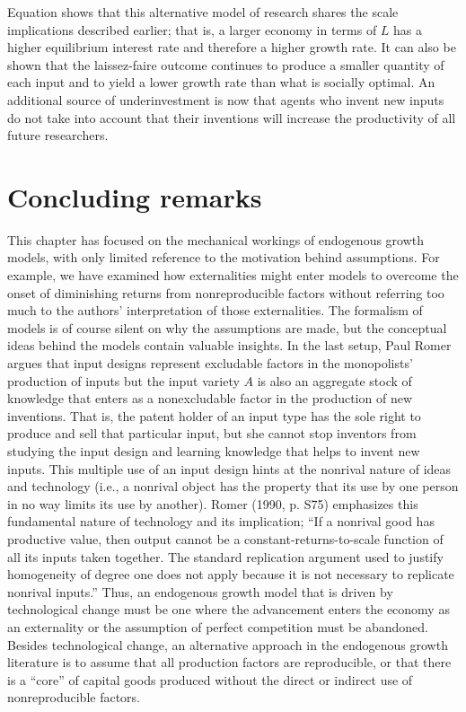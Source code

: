 Equation  shows that this alternative model of research shares the
scale implications described earlier; that is,
 a larger economy in terms of $L$ has
a higher equilibrium interest rate and therefore a higher growth rate. It
can also be shown that the laissez-faire outcome continues to produce a smaller
quantity of each input and to yield a lower growth rate than what is socially optimal.
An additional source of underinvestment is now that agents who invent new inputs
do not take into account that their inventions will increase the productivity
of all future researchers.




\section{Concluding remarks}

This chapter has focused on the mechanical workings of endogenous
growth models, with only limited reference to the motivation behind
assumptions.
For example, we have examined how externalities
might enter models to overcome the onset of diminishing returns from
nonreproducible factors without referring too much to the authors'
interpretation of those externalities. The formalism of
models is of course silent on why the assumptions are made, but
the conceptual ideas behind the models contain valuable insights.
In the last setup, Paul Romer
argues that input designs represent excludable factors
in the monopolists' production of inputs but the input variety $A$ is
also an aggregate stock of knowledge that enters as
a nonexcludable factor in the production
of new inventions. That is, the patent holder of an input type
has the sole right to produce and sell that particular input, but she
cannot stop inventors from studying the input design and learning
knowledge that helps to invent new inputs.
This multiple use of an input design hints at the nonrival nature
of ideas and technology (i.e., a nonrival object has the property that
its use by one person in no way limits its use by another).
Romer (1990, p. S75) emphasizes this fundamental nature of technology
and its implication; ``If a nonrival good has productive value, then
output cannot be a constant-returns-to-scale function of all its
inputs taken together. The standard replication argument used to
justify homogeneity of degree one does not apply because it is not
necessary to replicate nonrival inputs.'' Thus, an endogenous
growth model that is driven by technological change must be
one where the advancement enters the economy as an externality or the
assumption of perfect competition must be abandoned. Besides
technological change, an alternative approach in the endogenous
growth literature is to assume that all production factors are
reproducible, or that there is a ``core'' of capital goods produced without
the direct or indirect use of nonreproducible factors.

